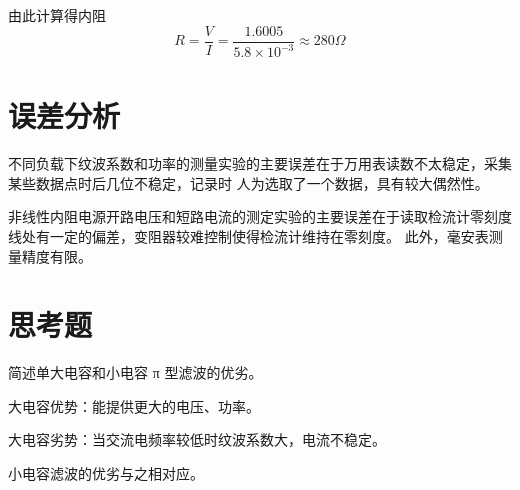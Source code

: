 \documentclass{article}
\begin{document}
由此计算得内阻\[R=\frac{V}{I}=\frac{1.6005}{5.8\times 10^{-3}}\approx280\Omega\]
\section*{误差分析}
不同负载下纹波系数和功率的测量实验的主要误差在于万用表读数不太稳定，采集某些数据点时后几位不稳定，记录时
人为选取了一个数据，具有较大偶然性。

非线性内阻电源开路电压和短路电流的测定实验的主要误差在于读取检流计零刻度线处有一定的偏差，变阻器较难控制使得检流计维持在零刻度。
此外，毫安表测量精度有限。

\section*{思考题}
简述单大电容和小电容 π 型滤波的优劣。

    大电容优势：能提供更大的电压、功率。
    
    大电容劣势：当交流电频率较低时纹波系数大，电流不稳定。

    小电容滤波的优劣与之相对应。
\end{document}
